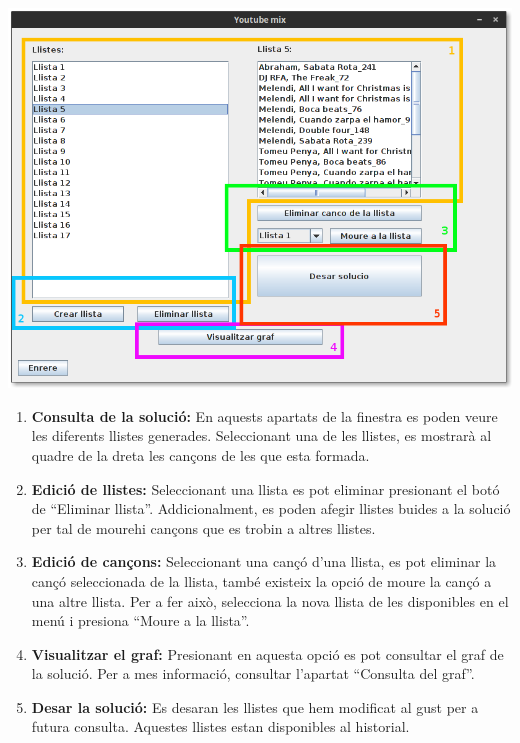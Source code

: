 \documentclass[a4paper,10pt,oneside]{sphinxmanual}
\begin{document}
\includegraphics{edit_llist.png}
\begin{enumerate}
\item {} 
\textbf{Consulta de la solució:} En aquests apartats de la finestra es poden veure les diferents llistes generades. Seleccionant una de les llistes, es mostrarà al quadre de la dreta les cançons de les que esta formada.

\item {} 
\textbf{Edició de llistes:} Seleccionant una llista es pot eliminar presionant el botó de ``Eliminar llista''. Addicionalment, es poden afegir llistes buides a la solució per tal de mourehi cançons que es trobin a altres llistes.

\item {} 
\textbf{Edició de cançons:} Seleccionant una cançó d'una llista, es pot eliminar la cançó seleccionada de la llista, també existeix la opció de moure la cançó a una altre llista. Per a fer això, selecciona la nova llista de les disponibles en el menú i presiona ``Moure a la llista''.

\item {} 
\textbf{Visualitzar el graf:} Presionant en aquesta opció es pot consultar el graf de la solució. Per a mes informació, consultar l'apartat ``Consulta del graf''.

\item {} 
\textbf{Desar la solució:} Es desaran les llistes que hem modificat al gust per a futura consulta. Aquestes llistes estan disponibles al historial.

\end{enumerate}
\end{document}
